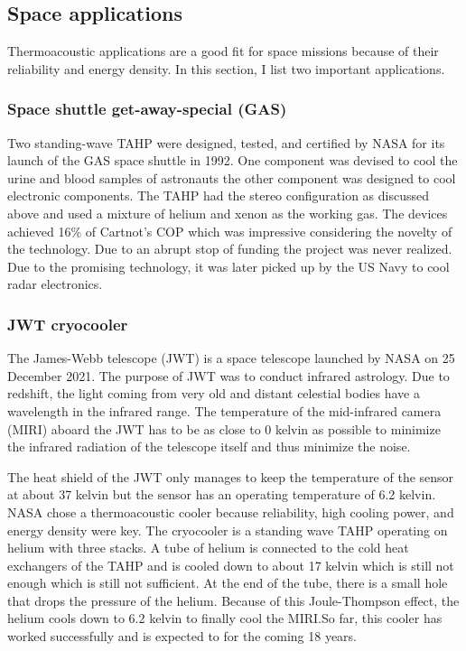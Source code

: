 \documentclass[a4paper]{article}
\newcommand{\newpara}
    {
      \bigbreak{}
      \noindent
    }
\begin{document}
\subsection{Space applications}
Thermoacoustic applications are a good fit for space missions because of their reliability and energy density. In this section, I list two important applications.
\subsubsection{Space shuttle get-away-special (GAS)\cite{AdeffSpace,powerofsound}}
Two standing-wave TAHP were designed, tested, and certified by NASA for its launch of the GAS space shuttle in 1992. One component was devised to cool the urine and blood samples of astronauts the other component was designed to cool electronic components. The TAHP had the stereo configuration as discussed above and used a mixture of helium and xenon as the working gas. The devices achieved 16\% of Cartnot's COP which was impressive considering the novelty of the technology. Due to an abrupt stop of funding the project was never realized. Due to the promising technology, it was later picked up by the US Navy to cool radar electronics.
\subsubsection{JWT cryocooler\cite{Petach2014MidII,Moore_2017,ross2022conceptual}}
The James-Webb telescope (JWT) is a space telescope launched by NASA on 25 December 2021. The purpose of JWT was to conduct infrared astrology. Due to redshift, the light coming from very old and distant celestial bodies have a wavelength in the infrared range. The temperature of the mid-infrared camera (MIRI) aboard the JWT has to be as close to 0 kelvin as possible to minimize the infrared radiation of the telescope itself and thus minimize the noise.
\newpara{}
The heat shield of the JWT only manages to keep the temperature of the sensor at about 37 kelvin but the sensor has an operating temperature of 6.2 kelvin. NASA chose a thermoacoustic cooler because reliability, high cooling power, and energy density were key. The cryocooler is a standing wave TAHP operating on helium with three stacks. A tube of helium is connected to the cold heat exchangers of the TAHP and is cooled down to about 17 kelvin which is still not enough which is still not sufficient. At the end of the tube, there is a small hole that drops the pressure of the helium. Because of this Joule-Thompson effect, the helium cools down to 6.2 kelvin to finally cool the MIRI.\@ So far, this cooler has worked successfully and is expected to for the coming 18 years.
\end{document}

